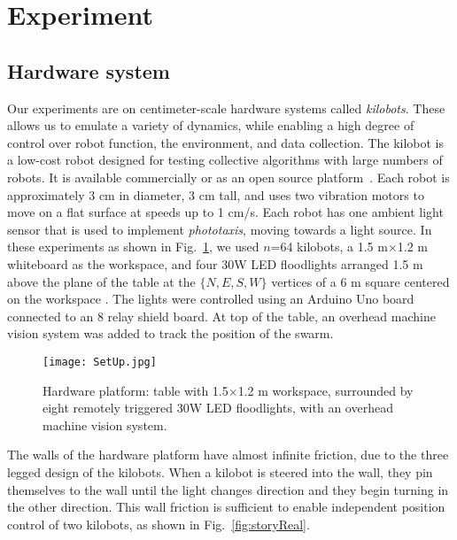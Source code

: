 
\section{Experiment}\label{sec:expResults}



\subsection{Hardware system}


Our experiments are on centimeter-scale hardware systems called \emph{kilobots}.  These allows us to emulate a variety of dynamics, while enabling a high degree of control over robot function, the environment, and data collection. The kilobot \citet{Rubenstein2012,rubenstein2014programmable} is a low-cost robot designed for testing collective algorithms with large numbers of robots. It is available commercially or as an open source platform~\citet{K-Team2015}.  Each robot is approximately 3 cm in diameter, 3 cm tall, and uses two vibration motors to move on a flat surface at speeds up to 1 cm/s.  Each robot has one ambient light sensor that is used to implement \emph{phototaxis},  moving towards a light source. 
In these experiments as shown in Fig.~\ref{fig:setup}, we used $n$=64 kilobots, a 1.5 m$\times$1.2 m whiteboard as the workspace, and four 30W LED floodlights arranged 1.5 m above the plane of the table at the $\{N,E,S,W\}$ vertices of a 6 m square centered on the workspace . The lights were controlled using an Arduino Uno board connected to an 8 relay shield board.  At top of the table, an overhead machine vision system was added to track the position of the swarm.


\begin{figure}
\begin{center}
	\texttt{[image: SetUp.jpg]}
\end{center}
\caption{\label{fig:setup}
Hardware platform:  table with 1.5$\times$1.2 m workspace, surrounded by eight remotely triggered 30W LED floodlights, with an overhead machine vision system.
}
\end{figure}

The walls of the hardware platform have almost infinite friction, due to the three legged design of the kilobots. When a kilobot is steered into the wall, they pin themselves to the wall until the light changes direction and they begin turning in the other direction.  This wall friction is sufficient to enable independent position control of two kilobots, as shown in Fig.~\ref{fig:storyReal}.



